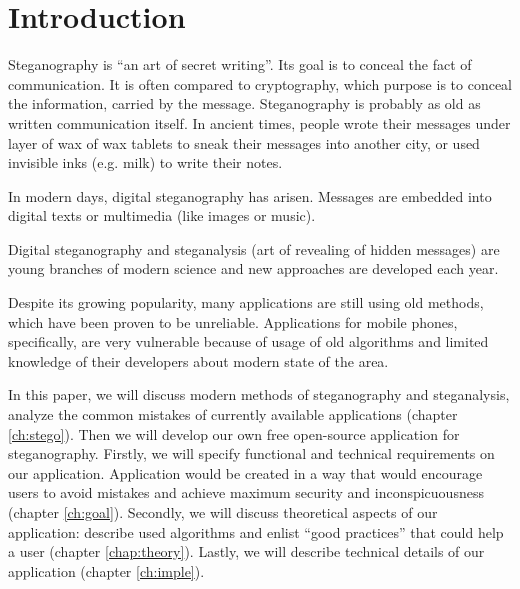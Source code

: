 \chapter*{Introduction}


Steganography is ``an art of secret writing''. Its goal is 
to conceal the fact of communication. It is often compared
to cryptography, which purpose is to conceal the information,
carried by the message. Steganography is probably as old as written
communication itself. In ancient times, people wrote their messages
under layer of wax of wax tablets to sneak their messages into another
city, or used invisible inks (e.g. milk) to write their notes.

In modern days, digital steganography has arisen. Messages are embedded
into digital texts or multimedia (like images or music).

Digital steganography and steganalysis (art of revealing of hidden messages) 
are young branches of modern science and new approaches are developed each year.

Despite its growing popularity, many applications are still using old methods,
which have been proven to be unreliable. Applications for mobile phones, specifically,
are very vulnerable because of usage of old algorithms and limited knowledge of their
developers about modern state of the area.

In this paper, we will discuss modern methods of steganography and steganalysis, analyze
the common mistakes of currently available applications (chapter \ref{ch:stego}). Then we
will develop our own free open-source application for steganography. Firstly, we will specify
functional and technical requirements on our application. Application would be created in a way
that would encourage users to avoid mistakes and achieve maximum security and inconspicuousness
(chapter \ref{ch:goal}). Secondly, we will discuss theoretical aspects of our application: describe
used algorithms and enlist ``good practices'' that could help a user (chapter \ref{chap:theory}).
Lastly, we will describe technical details of our application (chapter \ref{ch:imple}).
